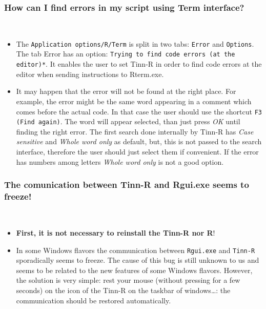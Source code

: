 \subsubsection{How can I find errors in my script using Term interface?}\\

\begin{itemize}
  \item The \texttt{Application options/R/Term} is split in two tabs: \texttt{Error} and \texttt{Options}.
    The tab Error has an option: \texttt{Trying to find code errors (at the editor)*}.
    It enables the user to set Tinn-R in order to find code errors at the editor when sending instructions to Rterm.exe.
  \item It may happen that the error will not be found at the right place.
    For example, the error might be the same word
    appearing in a comment which comes before the actual code.
    In that case the user should use the shortcut \texttt{F3 (Find again)}.
    The word will appear selected, than just press \textit{OK} until finding the right error.
    The first search done internally by Tinn-R has \textit{Case sensitive} and \textit{Whole word only} as default,
    but, this is not passed to the search interface, therefore the user should just select them if convenient.
    If the error has numbers among letters \textit{Whole word only} is not a good option.
\end{itemize}


\subsubsection{The comunication between Tinn-R and Rgui.exe seems to freeze!}\\

\begin{itemize}
  \item \textbf{First, it is not necessary to reinstall the Tinn-R nor R}!
  \item In some Windows flavors the communication between \texttt{Rgui.exe} and \texttt{Tinn-R} sporadically seems to freeze.
    The cause of this bug is still unknown to us and seems to be related to the new features of some Windows flavors.
    However, the solution is very simple: rest your mouse (without pressing for a few seconds) on the
    icon of the Tinn-R on the taskbar of windows\ldots: the communication should be restored automatically.
\end{itemize}

